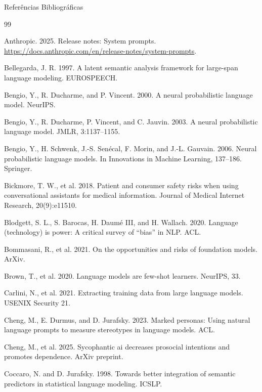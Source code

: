 \documentclass[aspectratio=169]{beamer}
\begin{document}
\begin{frame}[allowframebreaks]{Referências Bibliográficas}\justifying
    \begin{thebibliography}{99}
    {\scriptsize
    
     Anthropic. 2025. Release notes: System prompts. \url{https://docs.anthropic.com/en/release-notes/system-prompts}.
    
     Bellegarda, J. R. 1997. A latent semantic analysis framework for large-span language modeling. EUROSPEECH.
    
     Bengio, Y., R. Ducharme, and P. Vincent. 2000. A neural probabilistic language model. NeurIPS.
    
     Bengio, Y., R. Ducharme, P. Vincent, and C. Jauvin. 2003. A neural probabilistic language model. JMLR, 3:1137–1155.
    
     Bengio, Y., H. Schwenk, J.-S. Sen\'ecal, F. Morin, and J.-L. Gauvain. 2006. Neural probabilistic language models. In Innovations in Machine Learning, 137–186. Springer.
    
     Bickmore, T. W., et al. 2018. Patient and consumer safety risks when using conversational assistants for medical information. Journal of Medical Internet Research, 20(9):e11510.
    
     Blodgett, S. L., S. Barocas, H. Daum\'e III, and H. Wallach. 2020. Language (technology) is power: A critical survey of “bias” in NLP. ACL.
    
     Bommasani, R., et al. 2021. On the opportunities and risks of foundation models. ArXiv.
    
     Brown, T., et al. 2020. Language models are few-shot learners. NeurIPS, 33.
    
     Carlini, N., et al. 2021. Extracting training data from large language models. USENIX Security 21.
    
     Cheng, M., E. Durmus, and D. Jurafsky. 2023. Marked personas: Using natural language prompts to measure stereotypes in language models. ACL.
    
     Cheng, M., et al. 2025. Sycophantic ai decreases prosocial intentions and promotes dependence. ArXiv preprint.
    
     Coccaro, N. and D. Jurafsky. 1998. Towards better integration of semantic predictors in statistical language modeling. ICSLP.
    
}
\end{thebibliography}
\end{frame}
\end{document}
